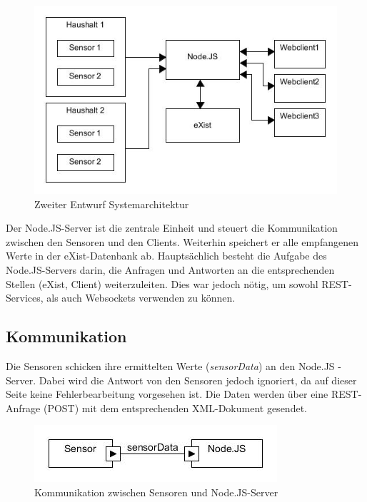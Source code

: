 \begin{figure}[h]
\begin{center}
\includegraphics[scale=0.55]{images/sa2.jpg} 
\caption{Zweiter Entwurf Systemarchitektur}
\end{center}
\end{figure}

Der Node.JS-Server ist die zentrale Einheit und steuert die Kommunikation zwischen den Sensoren und den Clients. Weiterhin speichert er alle empfangenen Werte in der eXist-Datenbank ab. Hauptsächlich besteht die Aufgabe des Node.JS-Servers darin, die Anfragen und Antworten an die entsprechenden Stellen (eXist, Client) weiterzuleiten. Dies war jedoch nötig, um sowohl REST-Services, als auch Websockets verwenden zu können.

\subsection{Kommunikation}
\label{subsec:Kommunikation}
Die Sensoren schicken ihre ermittelten Werte (\textit{sensorData}) an den Node.JS -Server. Dabei wird die Antwort von den Sensoren jedoch ignoriert, da auf dieser Seite keine  Fehlerbearbeitung vorgesehen ist. Die Daten werden über eine REST-Anfrage (POST) mit dem entsprechenden XML-Dokument gesendet.

\begin{figure}[H]
\begin{center}
\includegraphics[scale=0.6]{images/komm1.jpg} 
\caption{Kommunikation zwischen Sensoren und Node.JS-Server}
\end{center}
\end{figure}

